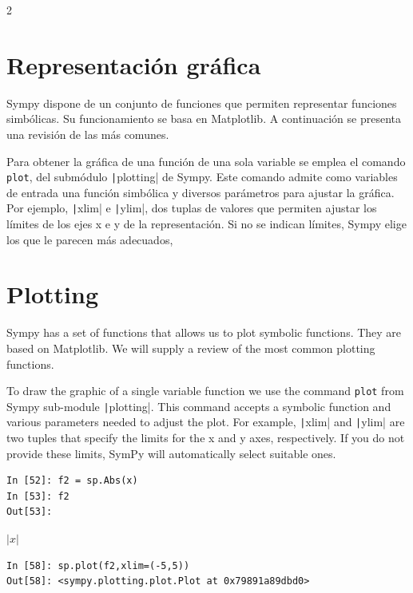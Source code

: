\begin{paracol}{2}
\section{Representación gráfica}
Sympy dispone de un conjunto de funciones que permiten representar funciones simbólicas. Su funcionamiento se basa en Matplotlib. A continuación se presenta una revisión de las más comunes.

Para obtener la gráfica de una función de una sola variable se emplea el comando \texttt{plot}, del submódulo \texttt|plotting| de Sympy. Este comando admite como variables de entrada una función simbólica y diversos parámetros para ajustar la gráfica. Por ejemplo, \texttt|xlim| e \texttt|ylim|, dos tuplas de valores que permiten ajustar los límites de los ejes x e y de la representación. Si no se indican límites, Sympy elige los que le parecen más adecuados,
\switchcolumn
\section{Plotting}
Sympy has a set of functions that allows us to plot symbolic functions. They are based on Matplotlib. We will supply a review of the most common plotting functions.

To draw the graphic of a single variable function we use the command \texttt{plot} from Sympy sub-module \texttt|plotting|. This command accepts a symbolic function and various parameters needed to adjust the plot. For example, \texttt|xlim| and \texttt|ylim| are two tuples that specify the limits for the x and y axes, respectively. If you do not provide these limits, SymPy will automatically select suitable ones.
\end{paracol} 
\begin{center}
	\begin{minipage}{.6\textwidth}
		\begin{verbatim}
In [52]: f2 = sp.Abs(x)
In [53]: f2
Out[53]:
 		\end{verbatim}
		$|x|$
		\begin{verbatim}
In [58]: sp.plot(f2,xlim=(-5,5))
Out[58]: <sympy.plotting.plot.Plot at 0x79891a89dbd0>
		\end{verbatim}
	\end{minipage}
\end{center}
  
